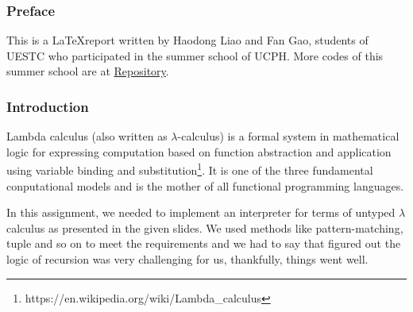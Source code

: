 \documentclass{article}
\begin{document}





\subsubsection*{Preface}

This is a \LaTeX  report written by Haodong Liao and Fan Gao, students of UESTC who participated in the summer school of UCPH. More codes of this summer school are at \href{https://github.com/Medill-East/ComputerScience/tree/master/Professional%20Core%20Courses/Functional%20Programming/SummerSchool/Advanced%20Functional%20Programming/AdvancedFunctionalProgramming/AdvancedFunctionalProgramming}{Repository}.

\subsubsection*{Introduction}

Lambda calculus (also written as $\lambda$-calculus) is a formal system in mathematical logic for expressing computation based on function abstraction and application using variable binding and substitution\footnote[1]{https://en.wikipedia.org/wiki/Lambda\_calculus}. It is one of the three fundamental conputational models and is the mother of all functional programming languages.

In this assignment, we needed to implement an interpreter for terms of untyped $\lambda$ calculus as presented in the given slides. We used methods like pattern-matching, tuple and so on to meet the requirements and we had to say that figured out the logic of recursion was very challenging for us, thankfully, things went well.

\end{document}
